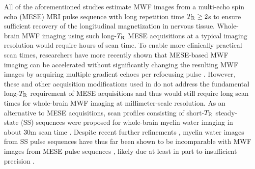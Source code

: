 All of the aforementioned studies
estimate MWF images
from a multi-echo spin echo (MESE) MRI pulse sequence
\cite{carr:54:eod}
with long repetition time $T_\mathrm{R}\geq2$s
to ensure sufficient recovery
of the longitudinal magnetization 
in nervous tissue.
Whole-brain MWF imaging 
using such long-$T_\mathrm{R}$ MESE acquisitions
at a typical imaging resolution
would require hours of scan time.
To enable more clinically practical scan times,
researchers have more recently shown
that MESE-based MWF imaging
can be accelerated
without significantly changing
the resulting MWF images \cite{does:00:rat,prasloski:12:rwc}
by acquiring multiple gradient echoes
per refocusing pulse \cite{feinberg:91:gga}.
However, 
these and other acquisition modifications
used in \cite{prasloski:12:rwc}
do not address the fundamental long-$T_\mathrm{R}$ requirement
of MESE acquisitions
and thus would still require long scan times
for whole-brain MWF imaging
at millimeter-scale resolution.
%
As an alternative to MESE acquisitions,
scan profiles consisting of short-$T_\mathrm{R}$ steady-state (SS) sequences
were proposed 
for whole-brain myelin water imaging in about 30m scan time
\cite{deoni:08:gmt}.
Despite recent further refinements
\cite{deoni:11:com, deoni:13:oct},
myelin water images from SS pulse sequences 
have thus far been shown
to be incomparable with MWF images
from MESE pulse sequences
\cite{zhang:15:com},
likely due at least in part
to insufficient precision \cite{lankford:13:oti}.

